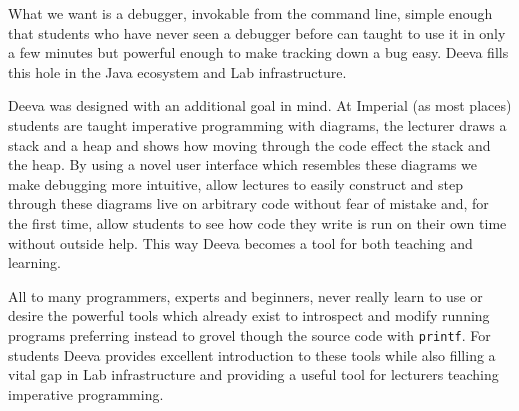 \documentclass[11pt, a4paper]{article}
\newcommand{\cmd}[1]{{\tt #1}}
\begin{document}
What we want is a debugger, invokable from the command line, simple enough that students who have never seen a debugger before can taught to use it in only a few minutes but powerful enough to make tracking down a bug easy.
Deeva fills this hole in the Java ecosystem and Lab infrastructure.

Deeva was designed with an additional goal in mind.
At Imperial (as most places) students are taught imperative programming with diagrams, the lecturer draws a stack and a heap and shows how moving through the code effect the stack and the heap.
By using a novel user interface which resembles these diagrams we make debugging more intuitive, allow lectures to easily construct and step through these diagrams live on arbitrary code without fear of mistake and, for the first time, allow students to see how code they write is run on their own time without outside help.
This way Deeva becomes a tool for both teaching and learning.

All to many programmers, experts and beginners, never really learn to use or desire the powerful tools which already exist to introspect and modify running programs preferring instead to grovel though the source code with \cmd{printf}.
For students Deeva provides excellent introduction to these tools while also filling a vital gap in Lab infrastructure and providing a useful tool for lecturers teaching imperative programming.


%

\end{document}
